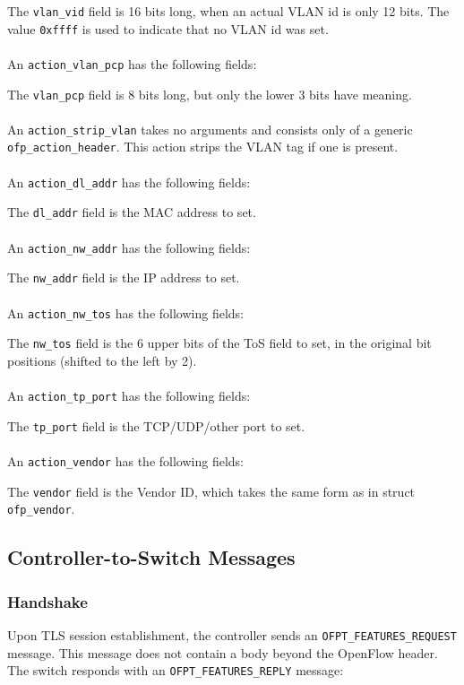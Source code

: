 
The \verb|vlan_vid| field is 16 bits long, when an actual VLAN id is only 12 bits. The value \verb|0xffff| is used to indicate that no VLAN id was set.
\\\\
An \verb|action_vlan_pcp| has the following fields:


The \verb|vlan_pcp| field is 8 bits long, but only the lower 3 bits have meaning.  
\\\\
An \verb|action_strip_vlan| takes no arguments and consists only of a generic \verb|ofp_action_header|.  This action strips the VLAN tag if one is present.
\\\\
An \verb|action_dl_addr| has the following fields:


The \verb|dl_addr| field is the MAC address to set.
\\\\
An \verb|action_nw_addr| has the following fields:


The \verb|nw_addr| field is the IP address to set.
\\\\
An \verb|action_nw_tos| has the following fields:


The \verb|nw_tos| field is the 6 upper bits of the ToS field to set, in the original bit positions (shifted to the left by 2).
\\\\
An \verb|action_tp_port| has the following fields:


The \verb|tp_port| field is the TCP/UDP/other port to set.
\\\\
An \verb|action_vendor| has the following fields:


The \verb|vendor| field is the Vendor ID, which takes the same form as in struct \verb|ofp_vendor|.

\subsection{Controller-to-Switch Messages}

\subsubsection{Handshake}
\label{cts:handshake} 
Upon TLS session establishment, the controller sends an \verb|OFPT_FEATURES_REQUEST| message.  This message does not contain a body beyond the OpenFlow header.  The switch responds with an \verb|OFPT_FEATURES_REPLY| message:


